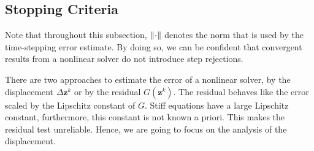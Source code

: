 \documentclass[a4paper,9pt]{article}
\theoremstyle{definition}
\theoremstyle{remark}
\begin{document}
\subsection{Stopping Criteria}
Note that throughout this subsection, $\norm{\cdot}$ denotes the norm that is
used by the time-stepping error estimate. By doing so, we can be confident that
convergent results from a nonlinear solver do not introduce step rejections.

There are two approaches to estimate the error of a nonlinear solver, by the
displacement $\Delta \bm{z}^k$ or by the residual $G(\bm{z}^k)$. The residual
behaves like the error scaled by the Lipschitz constant of $G$. Stiff equations
have a large Lipschitz constant, furthermore, this constant is not known a
priori. This makes the residual test unreliable. Hence, we are going to focus on
the analysis of the displacement.
\end{document}
